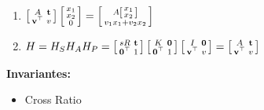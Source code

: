 \documentclass[12pt,a4paper]{article}
\begin{document}
\begin{itemize}
\begin{enumerate}
		\item $\left[ {\begin{smallmatrix}
		  A & {\bf t}\\
		 {\bf v}^{\top} & v \\
		\end{smallmatrix} } \right] \left[ {\begin{smallmatrix}
		 x_{1}\\
		 x_{2}\\
		 0\\
		\end{smallmatrix} } \right] = \left[ {\begin{smallmatrix}
		 A\left[ {\begin{smallmatrix}
		  x_{1}\\
		   x_{2}\\
		 \end{smallmatrix} } \right]\\
		 v_{1}x_{1}+v_{2}x_{2}\\
		\end{smallmatrix} } \right]
		$

		\item $H = H_{S}H_{A}H_{P} = \left[ {\begin{smallmatrix}
		 sR & {\bf t}\\
		 {\bf 0}^{\top} & 1 \\
		\end{smallmatrix} } \right]\left[ {\begin{smallmatrix}
		 K & {\bf 0}\\
		 {\bf 0}^{\top} & 1 \\
		\end{smallmatrix} } \right]\left[ {\begin{smallmatrix}
		 I & {\bf 0}\\
		 {\bf v}^{\top} & v \\
		\end{smallmatrix} } \right]=\left[ {\begin{smallmatrix}
		 A & {\bf t}\\
		 {\bf v}^{\top} & v \\
		\end{smallmatrix} } \right]
		$
	\end{enumerate}
	
	{\bf Invariantes:} 
	\begin{itemize}
		\item Cross Ratio
	\end{itemize}

\end{itemize}
\end{document}
